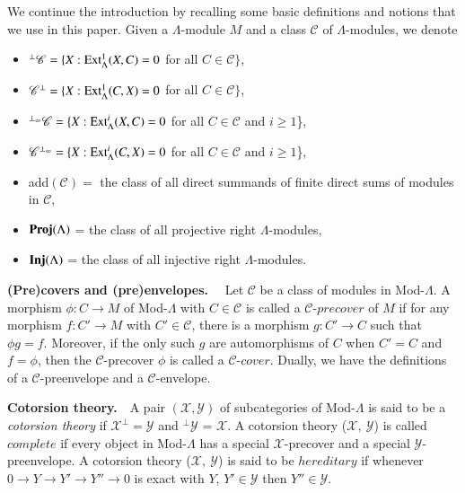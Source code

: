 \documentclass[11pt,a4paper]{article}
\begin{document}
We continue the introduction by recalling some basic definitions and notions
that we use in this paper. Given a $\Lambda$-module $M$ and a class $ \mathscr{C}$ of    $\Lambda$-modules, we denote

  \begin{itemize}
 \item  $^\perp {\mathscr{C}}=\{X: {\rm Ext_{\Lambda}^{1}}(X, C)=0$  for all $C\in
{\mathscr {C}}\}$,
 \item  $ {\mathscr {C}}^\perp=\{X: {\rm Ext_{\Lambda}^{1}}(C, X)=0$
for all $C\in {\mathscr {C}}\}$,
\item  $^{\perp_{\infty}} {\mathscr{C}}=\{X: {\rm Ext}_{\Lambda}^{i}(X, C)=0$  for all $C\in
{\mathscr {C}} $  and $i \geq 1$\},
 \item  $ {\mathscr {C}}^{\perp_{\infty}}=\{X: {\rm Ext}_{\Lambda}^{i}(C, X)=0 $
for all $C\in {\mathscr {C}}$  and $i \geq 1$\},
\item  add$(\mathscr {C}) =$   the class of all direct summands of
finite direct sums of modules in $ \mathscr{C}$,
\item${\bf Proj}(\Lambda)$
= the class of all projective right $\Lambda$-modules,
\item${\bf Inj}(\Lambda)$
= the class of all injective right $\Lambda$-modules.\end{itemize}


{\bf   (Pre)covers and (pre)envelopes.} \ \ Let $\mathscr{C}$    be a  class of modules in  Mod-$\Lambda$.
A  morphism $\phi: C\rightarrow M$ of Mod-$\Lambda$ with $C\in \mathscr{C}$ is called a  $\mathscr{C}$-$precover$ \cite{eno5} of $M$ if for any
morphism $f: C'\rightarrow M$ with $C'\in \mathscr{C}$,
there is a morphism $g : C'\rightarrow C$ such that $\phi g = f$. Moreover, if the only such $g$ are automorphisms of $C$ when
$C'= C$ and $f= \phi $, then the $\mathscr{C}$-precover $\phi$ is
called a $ \mathscr{C}$-$cover$. Dually, we have the
definitions of a  $\mathscr{C}$-preenvelope and a $\mathscr{C}$-envelope.
\\
\par
{\bf   Cotorsion  theory.}\ \ A pair $(\mathscr{X},\mathscr{Y})$  of subcategories of  Mod-$\Lambda$   is said to be  a  {\it cotorsion  theory} \cite{eno5} if ${\mathscr{X}}^\perp = {\mathscr{Y}}
 $ and $^\perp{\mathscr {Y}}$ = ${\mathscr {X}}$. A cotorsion theory (${\mathscr{X},\ \mathscr{Y}}$)
 is called $complete$   if every object in  Mod-$\Lambda$   has a   special  ${\mathscr{X}}$-precover
and  a   special  $\mathscr
{Y}$-preenvelope.  A
cotorsion theory (${\mathscr{X},\ \mathscr{Y}}$)
 is said to be  $ hereditary$   if whenever
 $0\rightarrow Y\rightarrow Y'\rightarrow
Y''\rightarrow 0$ is exact with $Y$, $Y'\in {\mathscr{Y}}$
then $Y''\in {\mathscr{Y}}$.
\end{document}
